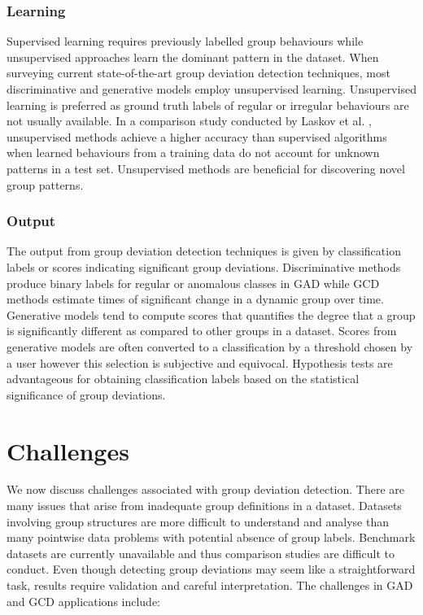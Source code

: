 \subsubsection{Learning}
Supervised learning requires previously labelled group behaviours while  
unsupervised approaches learn the dominant pattern in the dataset. 
When surveying current state-of-the-art group deviation detection 
 techniques, most discriminative  and generative models employ unsupervised learning.  
 Unsupervised learning is preferred as  ground truth labels of regular or irregular behaviours are not usually available. In a  comparison study conducted by Laskov et al. \cite{laskov2005learning},  unsupervised methods achieve a higher accuracy than  supervised algorithms when learned behaviours from a training data do not account for unknown patterns in a test set.  Unsupervised methods are beneficial for  discovering novel group patterns. 

\subsubsection{Output}
The output from group deviation detection techniques  is given by classification labels or  scores indicating significant group deviations.  
 Discriminative methods produce binary labels for regular or anomalous classes in GAD while GCD methods estimate times of significant change in a dynamic group over time.   Generative models  tend to compute scores that quantifies the degree that a  group is significantly different as compared to other groups in a dataset. Scores from generative models are often converted to a classification by a threshold chosen by a user however  this selection is subjective and equivocal.  Hypothesis tests are advantageous for obtaining classification labels based on the statistical significance of group deviations.  
  

  




\section{Challenges}
We now discuss challenges associated with group deviation detection. There are many issues that arise from inadequate group definitions in a dataset. Datasets involving group structures are more difficult to understand and analyse than many pointwise data problems with potential absence of group labels. Benchmark datasets are currently unavailable and thus comparison studies are difficult to conduct. Even though detecting group deviations may seem like a straightforward task, results require validation and careful interpretation. The challenges in  GAD and GCD applications  include:

